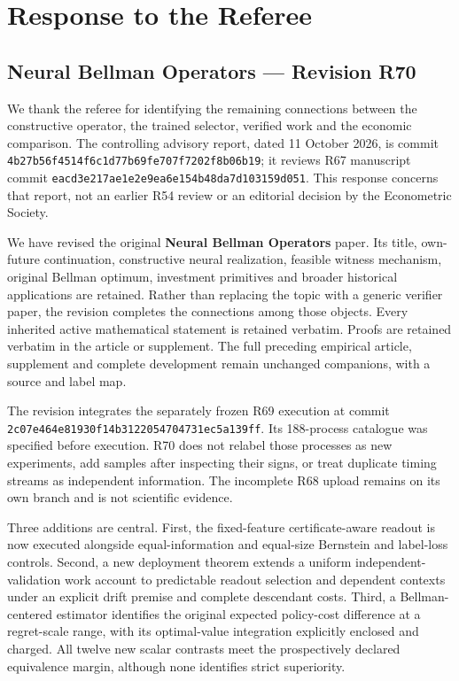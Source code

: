 \hypertarget{response-to-the-referee}{%
\section{Response to the Referee}\label{response-to-the-referee}}

\hypertarget{neural-bellman-operators-revision-r70}{%
\subsection{Neural Bellman Operators --- Revision
R70}\label{neural-bellman-operators-revision-r70}}

We thank the referee for identifying the remaining connections between
the constructive operator, the trained selector, verified work and the
economic comparison. The controlling advisory report, dated 11 October
2026, is commit \texttt{4b27b56f4514f6c1d77b69fe707f7202f8b06b19}; it
reviews R67 manuscript commit
\texttt{eacd3e217ae1e2e9ea6e154b48da7d103159d051}. This response
concerns that report, not an earlier R54 review or an editorial decision
by the Econometric Society.

We have revised the original \textbf{Neural Bellman Operators} paper.
Its title, own-future continuation, constructive neural realization,
feasible witness mechanism, original Bellman optimum, investment
primitives and broader historical applications are retained. Rather than
replacing the topic with a generic verifier paper, the revision
completes the connections among those objects. Every inherited active
mathematical statement is retained verbatim. Proofs are retained
verbatim in the article or supplement. The full preceding empirical
article, supplement and complete development remain unchanged
companions, with a source and label map.

The revision integrates the separately frozen R69 execution at commit
\texttt{2c07e464e81930f14b3122054704731ec5a139ff}. Its 188-process
catalogue was specified before execution. R70 does not relabel those
processes as new experiments, add samples after inspecting their signs,
or treat duplicate timing streams as independent information. The
incomplete R68 upload remains on its own branch and is not scientific
evidence.

Three additions are central. First, the fixed-feature certificate-aware
readout is now executed alongside equal-information and equal-size
Bernstein and label-loss controls. Second, a new deployment theorem
extends a uniform independent-validation work account to predictable
readout selection and dependent contexts under an explicit drift premise
and complete descendant costs. Third, a Bellman-centered estimator
identifies the original expected policy-cost difference at a
regret-scale range, with its optimal-value integration explicitly
enclosed and charged. All twelve new scalar contrasts meet the
prospectively declared equivalence margin, although none identifies
strict superiority.

